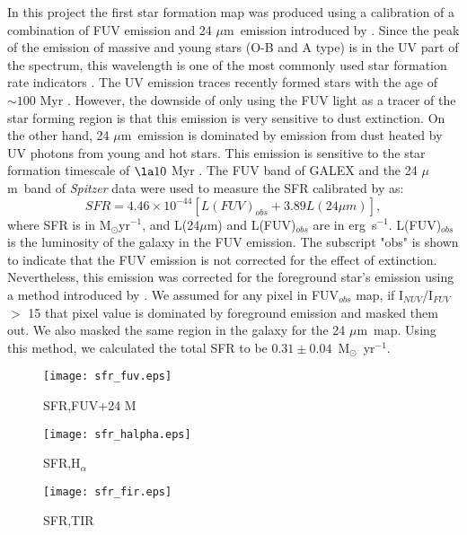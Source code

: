 \documentclass[useAMS,usenatbib]{mn2e}
\newcommand \halpha    {H$\alpha $\ }
\newcommand \um    {$\mu$m\ }
\newcommand \Spitzer {{\it Spitzer }}
\newcommand \Galex {GALEX }
\begin{document}
In this project the first star formation map was produced using a calibration of a combination of FUV emission and 24 \um emission introduced by \cite{Hao11}. Since the peak of the emission of massive and young stars (O-B and A type) is in the UV part of the spectrum, this wavelength is one of the most commonly used star formation rate indicators \citep[e.g.,][]{Kennicutt89}. The UV emission traces recently formed stars with the age of $\sim 100$ Myr \citep[e.g.,][]{Kennicutt98a, Calzetti05}. However, the downside of only using the FUV light as a tracer of the star forming region is that this emission is very sensitive to dust extinction. On the other hand, 24 \um emission is dominated by emission from dust heated by UV photons from young and hot stars. This emission is sensitive to the star formation timescale of $\la10$ Myr \citep{Calzetti07}. The FUV band of \Galex and the 24 \um band of \Spitzer data were used to measure the SFR calibrated by \cite{Hao11} as:
\begin{equation}
\label{equ: fuvplus24}
SFR =4.46\times10^{-44}[L(FUV)_{obs}+3.89L(24\mu m)],
\end{equation}
where SFR is in M$_{\odot}$yr$^{-1}$, and L(24$\mu$m) and L(FUV)$_{obs}$ are in erg~s$^{-1}$. L(FUV)$_{obs}$ is the luminosity of the galaxy in the FUV emission. The subscript "obs" is shown to indicate that the FUV emission is not corrected for the effect of extinction. Nevertheless, this emission was corrected for the foreground star's emission using a method introduced by \cite{Leroy08}. We assumed for any pixel in FUV$_{obs}$ map, if I$_{NUV}$/I$_{FUV}$ $>$ 15 that pixel value is dominated by foreground emission and masked them out. We also masked the same region in the galaxy for the 24 \um map. Using this method, we calculated the total SFR to be $0.31\pm 0.04$~M$_{\odot}$~yr$^{-1}$.


\begin{figure*}
    \centering
    \begin{subfigure}[b]{1\textwidth}
        \centering
        \texttt{[image: sfr\_fuv.eps]}
        \caption{SFR,FUV+24 M}
        \label{fig:sfr,fuv}
    \end{subfigure}
    \hfill
    \begin{subfigure}[b]{1\textwidth}
        \centering
        \texttt{[image: sfr\_halpha.eps]}
        \caption{SFR,H$_{\alpha}$}
        \label{fig:sfr_halpha}
    \end{subfigure}
    \hfill
    \begin{subfigure}[b]{1\textwidth}
        \centering
        \texttt{[image: sfr\_fir.eps]}
        \caption{SFR,TIR}
        \label{fig:sfr,fir}
    \end{subfigure}
    \caption{SFR map from a combination of FUV + 24 M emission (top), \halpha and 24 M emission (middle), and total infrared emission (bottom)}
    \label{fig:sfrs}
\end{figure*}
\end{document}
